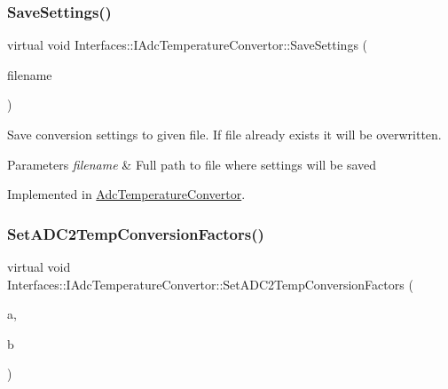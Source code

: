 \subsubsection{\texorpdfstring{Save\+Settings()}{SaveSettings()}}
{\footnotesize\ttfamily virtual void Interfaces\+::\+I\+Adc\+Temperature\+Convertor\+::\+Save\+Settings (\begin{DoxyParamCaption}\item[{Q\+String}]{filename }\end{DoxyParamCaption})\hspace{0.3cm}{\ttfamily [pure virtual]}}



Save conversion settings to given file. If file already exists it will be overwritten. 


\begin{DoxyParams}{Parameters}
{\em filename} & Full path to file where settings will be saved \\
\hline
\end{DoxyParams}


Implemented in \hyperlink{class_adc_temperature_convertor_aa6935469c6bb9e2df9a21495d7e8b72a}{Adc\+Temperature\+Convertor}.

\mbox{\label{class_interfaces_1_1_i_adc_temperature_convertor_a3e4c9204b3593bc434a041c7a69c430f}} 
\subsubsection{\texorpdfstring{Set\+A\+D\+C2\+Temp\+Conversion\+Factors()}{SetADC2TempConversionFactors()}}
{\footnotesize\ttfamily virtual void Interfaces\+::\+I\+Adc\+Temperature\+Convertor\+::\+Set\+A\+D\+C2\+Temp\+Conversion\+Factors (\begin{DoxyParamCaption}\item[{double}]{a,  }\item[{double}]{b }\end{DoxyParamCaption})\hspace{0.3cm}{\ttfamily [pure virtual]}}



